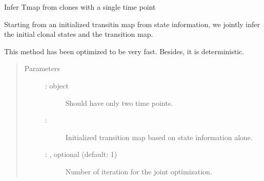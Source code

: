 \documentclass[letterpaper,10pt,english]{sphinxmanual}
\begin{document}
\begin{fulllineitems}
\label{\detokenize{cospar.tmap.infer_Tmap_from_one_time_clones_private:cospar.tmap.infer_Tmap_from_one_time_clones_private}}
Infer Tmap from clones with a single time point

Starting from an initialized transitin map from state information,
we jointly infer the initial clonal states and the transition map.

This method has been optimized to be very fast. Besides, it is
deterministic.
\begin{quote}\begin{description}
\item[{Parameters}] \leavevmode\begin{description}
\item[{ :  object}] \leavevmode
Should have only two time points.

\item[{ : }] \leavevmode
Initialized transition map based on state information alone.

\item[{ : , optional (default: 1)}] \leavevmode
Number of iteration for the joint optimization.


\end{description}
\end{description}
\end{quote}
\end{fulllineitems}
\end{document}
